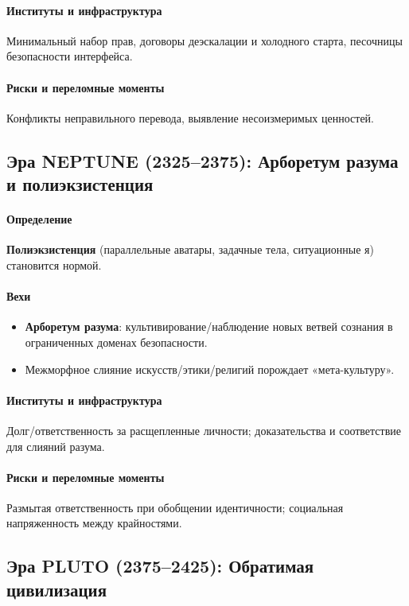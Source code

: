 \documentclass[11pt]{article}
\begin{document}
\paragraph{Институты и инфраструктура} Минимальный набор прав, договоры деэскалации и холодного старта, песочницы безопасности интерфейса.

\paragraph{Риски и переломные моменты} Конфликты неправильного перевода, выявление несоизмеримых ценностей.

\subsection{Эра NEPTUNE (2325–2375): Арборетум разума и полиэкзистенция}
\paragraph{Определение} \textbf{Полиэкзистенция} (параллельные аватары, задачные тела, ситуационные я) становится нормой.

\paragraph{Вехи}
\begin{itemize}[noitemsep]
  \item \textbf{Арборетум разума}: культивирование/наблюдение новых ветвей сознания в ограниченных доменах безопасности.
  \item Межморфное слияние искусств/этики/религий порождает «мета-культуру».
\end{itemize}

\paragraph{Институты и инфраструктура} Долг/ответственность за расщепленные личности; доказательства и соответствие для слияний разума.

\paragraph{Риски и переломные моменты} Размытая ответственность при обобщении идентичности; социальная напряженность между крайностями.

\subsection{Эра PLUTO (2375–2425): Обратимая цивилизация}
\end{document}
